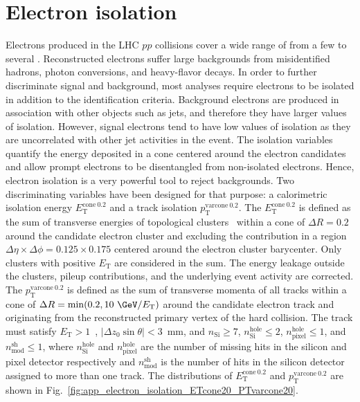 \section{Electron isolation}
\label{sec:app_electron_isolation}
Electrons produced in the LHC $pp$ collisions cover a wide range of \met from a few {\GeV} to several {\TeV}.
Reconstructed electrons suffer large backgrounds from misidentified hadrons, photon conversions, and heavy-flavor decays.
In order to further discriminate signal and background, most analyses require electrons to be isolated in addition to the identification criteria.
Background electrons are produced in association with other objects such as jets, and therefore they have larger values of isolation. 
However, signal electrons tend to have low values of isolation as they are uncorrelated with other jet activities in the event.
The isolation variables quantify the energy deposited in a cone centered around the electron candidates and allow prompt electrons to be disentangled from non-isolated electrons.
Hence, electron isolation is a very powerful tool to reject backgrounds.
Two discriminating variables have been designed for that purpose: a calorimetric isolation energy $E_\mathrm{T}^\mathrm{cone\ 0.2}$ and a track isolation $p_\mathrm{T}^\mathrm{varcone\ 0.2}$.
The $E_\mathrm{T}^\mathrm{cone\ 0.2}$ is defined as the sum of transverse energies of topological clusters~\cite{Aad:2016upy} within a cone of $\Delta R = 0.2$ around the candidate electron cluster and excluding the contribution in a region $\Delta \eta \times \Delta \phi = 0.125 \times 0.175$ centered around the electron cluster barycenter.
Only clusters with positive $E_\mathrm{T}$ are considered in the sum.
The energy leakage outside the clusters, pileup contributions, and the underlying event activity are corrected. 
The $p_\mathrm{T}^\mathrm{varcone\ 0.2}$ is defined as the sum of transverse momenta of all tracks within a cone of $\Delta R = \mathrm{min}(0.2, 10~{\GeV}/E_\mathrm{T})$ around the candidate electron track and originating from the reconstructed primary vertex of the hard collision.
The track must satisfy $E_\mathrm{T} > 1$~{\GeV}, $|\Delta z_{0} \sin \theta| < 3$~mm, and $n_\mathrm{Si} \ge 7$, $n_\mathrm{Si}^\mathrm{hole} \le 2$, $n_\mathrm{pixel}^\mathrm{hole} \le 1$, and $n_\mathrm{mod}^\mathrm{sh} \le 1$, where $n_\mathrm{Si}^\mathrm{hole}$ and $n_\mathrm{pixel}^\mathrm{hole}$ are the number of missing hits in the silicon and pixel detector respectively and $n_\mathrm{mod}^\mathrm{sh}$ is the number of hits in the silicon detector assigned to more than one track.
The distributions of $E_\mathrm{T}^\mathrm{cone\ 0.2}$ and $p_\mathrm{T}^\mathrm{varcone\ 0.2}$ are shown in Fig.~\ref{fig:app_electron_isolation_ETcone20_PTvarcone20}.

